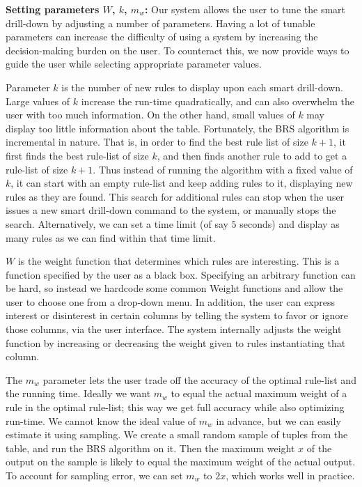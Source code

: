 \documentclass[10pt,journal,compsoc]{IEEEtran}
\newcommand{\stitle}[1]{\vspace{0.5em}\noindent\textbf{#1}}
\newcommand{\techreporttext}[1]{#1}
\begin{document}
\techreporttext{
\stitle{Setting parameters $W$, $k$, $m_w$:} Our system allows the user to tune the smart drill-down by adjusting a number of parameters. Having a lot of tunable parameters can increase the difficulty of using a system by increasing the decision-making burden on the user. To counteract this, we now provide ways to guide the user while selecting appropriate parameter values.

Parameter $k$ is the number of new rules to display upon each smart drill-down. Large values of $k$ increase the run-time quadratically, and can also overwhelm the user with too much information. On the other hand, small values of $k$ may display too little information about the table. Fortunately, the BRS algorithm is incremental in nature. That is, in order to find the best rule list of size $k+1$, it first finds the best rule-list of size $k$, and then finds another rule to add to get a rule-list of size $k+1$. Thus instead of running the algorithm with a fixed value of $k$, it can start with an empty rule-list and keep adding rules to it, displaying new rules as they are found. This search for additional rules can stop when the user issues a new smart drill-down command to the system, or manually stops the search. Alternatively, we can set a time limit (of say $5$ seconds) and display as many rules as we can find within that time limit.

$W$ is the weight function that determines which rules are interesting. This is a function specified by the user as a black box. Specifying an arbitrary function can be hard, so instead we hardcode some common Weight functions and allow the user to choose one from a drop-down menu. In addition, the user can express interest or disinterest in certain columns by telling the system to favor or ignore those columns, via the user interface. The system internally adjusts the weight function by increasing or decreasing the weight given to rules instantiating that column.

The $m_w$ parameter lets the user trade off the accuracy of the optimal rule-list and the running time. Ideally we want $m_w$ to equal the actual maximum weight of a rule in the optimal rule-list; this way we get full accuracy while also optimizing run-time. We cannot know the ideal value of $m_w$ in advance, but we can easily estimate it using sampling. We create a small random sample of tuples from the table, and run the BRS algorithm on it. Then the maximum weight $x$ of the output on the sample is likely to equal the maximum weight of the actual output. To account for sampling error, we can set $m_w$ to $2x$, which works well in practice.
}
\end{document}
